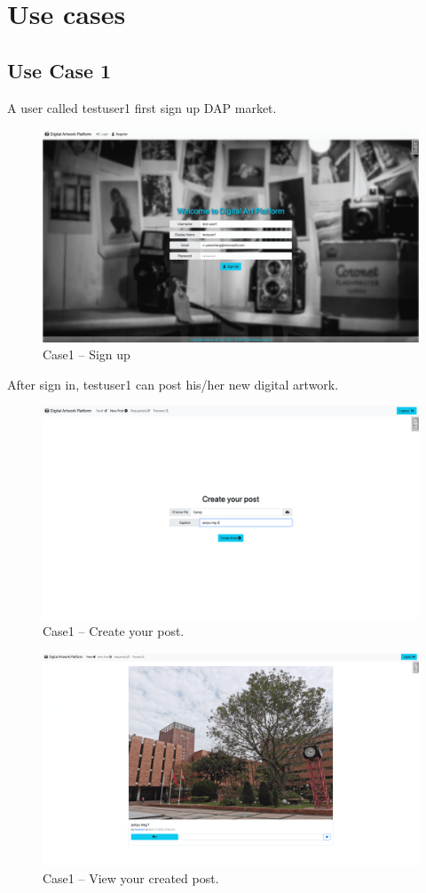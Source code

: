 \clearpage
\section{Use cases}

\subsection{Use Case 1}

A user called testuser1 first sign up DAP market.

\begin{figure}[ht]
    \centering
    \includegraphics[width=0.7\linewidth]{figures/case1-2.png}
    \caption{Case1 -- Sign up}
    \label{fig: case1-2}
\end{figure}

After sign in, testuser1 can post his/her new digital artwork.

\begin{figure}[!h]
    \centering
    \includegraphics[width=0.8\linewidth]{figures/case1-3.png}
    \caption{Case1 -- Create your post.}
    \label{fig: case1-3}
\end{figure}

\begin{figure}[!h]
    \centering
    \includegraphics[width=0.8\linewidth]{figures/case1-4.png}
    \caption{Case1 -- View your created post.}
    \label{fig: case1-4}
\end{figure}

